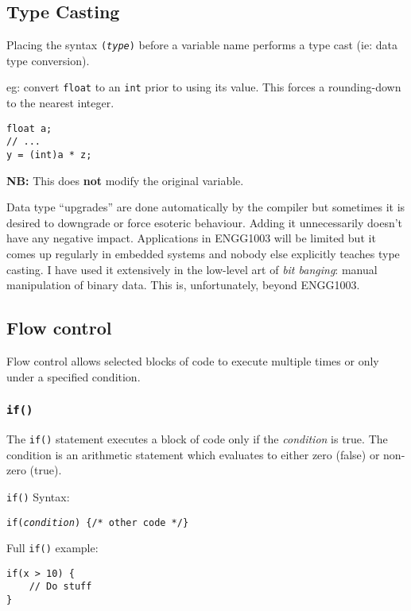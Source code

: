\documentclass{lab}
\begin{document}
\begin{multicols}{2}
\subsection{Type Casting}
Placing the syntax \texttt{(\textit{type})} before a variable name performs a type cast (ie: data type conversion).

eg: convert \texttt{float} to an \texttt{int} prior to using its value. This forces a rounding-down to the nearest integer.

\begin{lstlisting}[style=CStyle]
float a;
// ...
y = (int)a * z;
\end{lstlisting}

\textbf{NB:} This does \textbf{not} modify the original variable.

Data type ``upgrades'' are done automatically by the compiler but sometimes it is desired to downgrade or force esoteric behaviour. Adding it unnecessarily doesn't have any negative impact. Applications in ENGG1003 will be limited but it comes up regularly in embedded systems and nobody else explicitly teaches type casting. I have used it extensively in the low-level art of \textit{bit banging}: manual manipulation of binary data. This is, unfortunately, beyond ENGG1003.

\subsection{Flow control}

Flow control allows selected blocks of code to execute multiple times or only under a specified condition.

\subsubsection{\texttt{if()}}\label{sec:if}

The \texttt{if()} statement executes a block of code only if the \textit{condition} is true. The condition is an arithmetic statement which evaluates to either zero (false) or non-zero (true).

\texttt{if()} Syntax:

\texttt{if(\textit{condition}) \{/* other code */\}}

\columnbreak
Full \texttt{if()} example:

\begin{lstlisting}[style=CStyle]
if(x > 10) {
	// Do stuff
}
\end{lstlisting}


\end{multicols}
\end{document}
